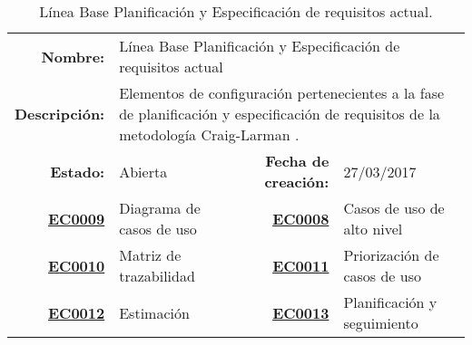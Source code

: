 \begin{table}[h]
\begin{center}
\begin{tabular}{ r l | r l }
\hline
\textbf{Nombre:} & \multicolumn{3}{p{10cm}}{Línea Base Planificación y Especificación de requisitos actual} \\
\textbf{Descripción:} & \multicolumn{3}{p{10cm}}{Elementos de configuración pertenecientes a la fase de planificación y especificación de requisitos de la metodología Craig-Larman \cite{ART:CraigLarman}.} \\ \hline \hline
\textbf{Estado:} & Abierta & \textbf{Fecha de creación:} & 27/03/2017 \\ \hline
\textbf{\hyperref[EC:0009]{EC0009}} & Diagrama de casos de uso & \textbf{\hyperref[EC:0008]{EC0008}} & Casos de uso de alto nivel \\
\textbf{\hyperref[EC:0010]{EC0010}} & Matriz de trazabilidad & \textbf{\hyperref[EC:0011]{EC0011}} & Priorización de casos de uso \\
\textbf{\hyperref[EC:0012]{EC0012}} & Estimación & \textbf{\hyperref[EC:0013]{EC0013}} & Planificación y seguimiento \\
\hline
\end{tabular}
\caption{Línea Base Planificación y Especificación de requisitos actual.}
\label{tab:baseLineReqAct}
\end{center}
\end{table}
